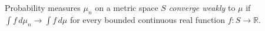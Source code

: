 
Probability measures $\mu_n$ on a metric space $S$ \emph{converge weakly} to $\mu$ if $\int f\,d\mu_n\to\int f\,d\mu$ for every bounded continuous real function $f:S\to\mathbb R$.
